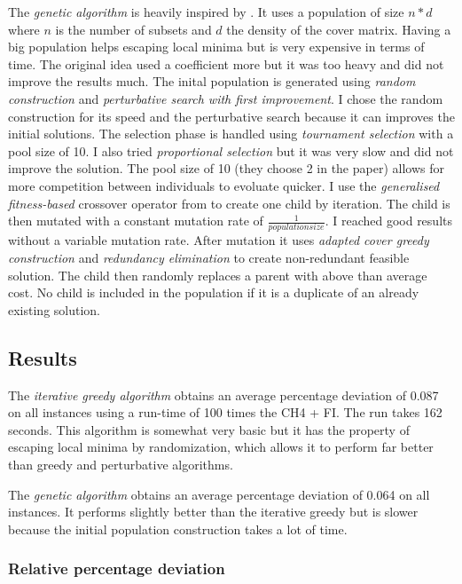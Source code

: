 \documentclass[a4paper,12pt]{article}
\begin{document}
The \textit{genetic algorithm} is heavily inspired by \cite{beasley1996genetic}. 
It uses a population of size $ n * d $ where $ n $ is the number of subsets and $ d $ the density of the cover matrix. Having a big population helps escaping local minima but is very expensive in terms of time. The original idea used a coefficient more but it was too heavy and did not improve the results much.
The inital population is generated using \textit{random construction} and \textit{perturbative search with first improvement}. I chose the random construction for its speed and the perturbative search because it can improves the initial solutions.
The selection phase is handled using \textit{tournament selection} with a pool size of 10. I also tried \textit{proportional selection} but it was very slow and did not improve the solution. The pool size of 10 (they choose 2 in the paper) allows for more competition between individuals to evoluate quicker.
I use the \textit{generalised fitness-based} crossover operator from \cite{beasley1996genetic} to create one child by iteration.
The child is then mutated with a constant mutation rate of $ \frac{1}{population size} $. I reached good results without a variable mutation rate.
After mutation it uses \textit{adapted cover greedy construction} and \textit{redundancy elimination} to create non-redundant feasible solution.
The child then randomly replaces a parent with above than average cost. No child is included in the population if it is a duplicate of an already existing solution.

\subsection{Results}

The \textit{iterative greedy algorithm} obtains an average percentage deviation of 0.087 on all instances using a run-time of 100 times the CH4 + FI. The run takes 162 seconds. This algorithm is somewhat very basic but it has the property of escaping local minima by randomization, which allows it to perform far better than greedy and perturbative algorithms.

The \textit{genetic algorithm} obtains an average percentage deviation of 0.064 on all instances. It performs slightly better than the iterative greedy but is slower because the initial population construction takes a lot of time.


\subsubsection{Relative percentage deviation}
\end{document}
